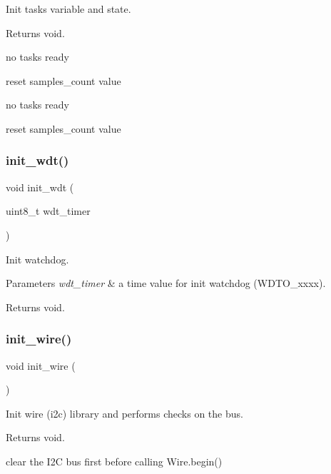 Init tasks variable and state. 

\begin{DoxyReturn}{Returns}
void. 
\end{DoxyReturn}
no tasks ready

reset samples\+\_\+count value

no tasks ready

reset samples\+\_\+count value \mbox{\label{i2c-th_8h_a980e73df66b14b1190bc25da430a4f12}} 
\subsubsection{\texorpdfstring{init\+\_\+wdt()}{init\_wdt()}}
{\footnotesize\ttfamily void init\+\_\+wdt (\begin{DoxyParamCaption}\item[{uint8\+\_\+t}]{wdt\+\_\+timer }\end{DoxyParamCaption})}



Init watchdog. 


\begin{DoxyParams}{Parameters}
{\em wdt\+\_\+timer} & a time value for init watchdog (W\+D\+T\+O\+\_\+xxxx). \\
\hline
\end{DoxyParams}
\begin{DoxyReturn}{Returns}
void. 
\end{DoxyReturn}
\mbox{\label{i2c-th_8h_a7c21452937863fa02a29654247eef09b}} 
\subsubsection{\texorpdfstring{init\+\_\+wire()}{init\_wire()}}
{\footnotesize\ttfamily void init\+\_\+wire (\begin{DoxyParamCaption}{ }\end{DoxyParamCaption})}



Init wire (i2c) library and performs checks on the bus. 

\begin{DoxyReturn}{Returns}
void. 
\end{DoxyReturn}
clear the I2C bus first before calling Wire.\+begin()

